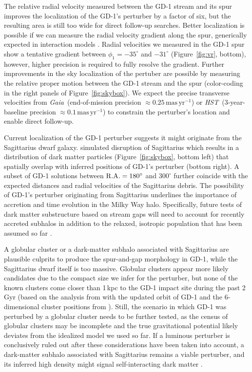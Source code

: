 \documentclass[twocolumn]{aastex63}
\newcommand{\gaia}{\textsl{Gaia}}
\newcommand{\hst}{\textsl{HST}}
\newcommand{\masyr}{\ensuremath{\textrm{mas}\,\textrm{yr}^{-1}}}
\begin{document}
The relative radial velocity measured between the GD-1 stream and its spur improves the localization of the GD-1's perturber by a factor of six, but the resulting area is still too wide for direct follow-up searches.
Better localization is possible if we can measure the radial velocity gradient along the spur, generically expected in interaction models \citep{bonaca2019a}.
Radial velocities we measured in the GD-1 spur show a tentative gradient between $\phi_1=-35^\circ$ and $-31^\circ$ (Figure~\ref{fig:vr}, bottom), however, higher precision is required to fully resolve the gradient.
Further improvements in the sky localization of the pertuber are possible by measuring the relative proper motion between the GD-1 stream and the spur (color-coding in the right panels of Figure~\ref{fig:skybox}).
We expect the precise transverse velocities from \gaia\ (end-of-mission precision $\approx0.25\,\masyr$) or \hst\ (3-year-baseline precision $\approx0.1\,\masyr$) to constrain the perturber's location and enable direct follow-up.

Current localization of the GD-1 perturber suggests it might originate from the Sagittarius dwarf galaxy.
\citet{dl2017} simulated disruption of Sagittarius which results in a distribution of dark matter particles (Figure~\ref{fig:skybox}, bottom left) that spatially overlap with inferred positions of GD-1's perturber (bottom right).
A subset of GD-1 solutions between $\rm R.A.=180^\circ$ and $300^\circ$ further coincide with the expected distances and radial velocities of the Sagittarius debris.
The possibility of GD-1's perturber originating from Sagittarius underlines the importance of accretion and time evolution in the Milky Way halo.
Specifically, future tests of dark matter substructure based on stream gaps will need to account for recently accreted subhalos in addition to the relaxed, isotropic population that has been assumed so far \citep[e.g.,][]{erkal2016, banik2019}.

A globular cluster or a dark-matter subhalo associated with Sagittarius are plausible culprits to produce the spur-and-gap morphology in GD-1, while the Sagittarius dwarf itself is too massive.
Globular clusters appear more likely candidates due to the compact size we infer for the perturber, but none of the known clusters come closer than 1\,kpc to the GD-1 impact site during the past 2\,Gyr (based on the analysis from \citealt{bonaca2019a} with the updated orbit of GD-1 and the 6-dimensional cluster positions from \citealt{baumgardt2019}).
Still, the scenario in which GD-1 was perturbed by a globular cluster needs to be further tested, as the census of globular clusters may be incomplete and the true gravitational potential likely deviates from the idealized model we used so far.
If a luminous perturber is conclusively ruled out after these considerations have been taken into account, a dark-matter subhalo associated with Sagittarius remains a viable perturber, and its inferred high density might signal self-interacting dark matter \citep[e.g.,][]{kahlhoefer2019}.
\end{document}
